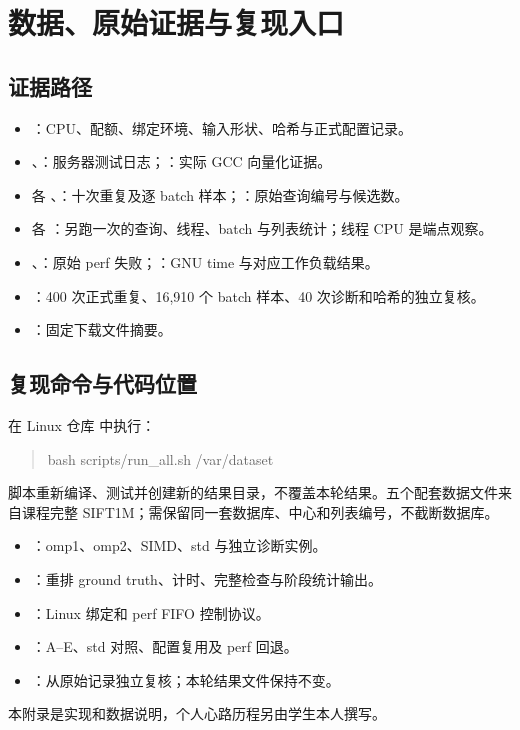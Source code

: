 \newpage
\section{数据、原始证据与复现入口}

\subsection{证据路径}
\begin{itemize}
\item {}：CPU、配额、绑定环境、输入形状、哈希与正式配置记录。
\item {}、：服务器测试日志；：实际 GCC 向量化证据。
\item 各 、：十次重复及逐 batch 样本；：原始查询编号与候选数。
\item 各 ：另跑一次的查询、线程、batch 与列表统计；线程 CPU 是端点观察。
\item {}、：原始 perf 失败；：GNU time 与对应工作负载结果。
\item {}：400 次正式重复、16,910 个 batch 样本、40 次诊断和哈希的独立复核。
\item {}：固定下载文件摘要。
\end{itemize}

\subsection{复现命令与代码位置}
在 Linux 仓库  中执行：
\begin{quote}\ttfamily\small
bash scripts/run\_all.sh /var/dataset
\end{quote}
脚本重新编译、测试并创建新的结果目录，不覆盖本轮结果。五个配套数据文件来自课程完整 SIFT1M；需保留同一套数据库、中心和列表编号，不截断数据库。
\begin{itemize}
\item {}：omp1、omp2、SIMD、std 与独立诊断实例。
\item {}：重排 ground truth、计时、完整检查与阶段统计输出。
\item {}：Linux 绑定和 perf FIFO 控制协议。
\item {}：A--E、std 对照、配置复用及 perf 回退。
\item {}：从原始记录独立复核；本轮结果文件保持不变。
\end{itemize}
本附录是实现和数据说明，个人心路历程另由学生本人撰写。

